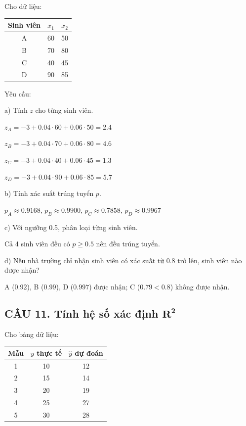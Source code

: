 \documentclass[a4paper,12pt]{article}
\begin{document}
Cho dữ liệu:
\begin{center}
\begin{tabular}{|c|c|c|}
\hline
Sinh viên & $x_1$ & $x_2$ \\
\hline
A & 60 & 50 \\
B & 70 & 80 \\
C & 40 & 45 \\
D & 90 & 85 \\
\hline
\end{tabular}
\end{center}

Yêu cầu:

a) Tính $z$ cho từng sinh viên.

$z_A = -3 + 0.04 \cdot 60 + 0.06 \cdot 50 = 2.4$

$z_B = -3 + 0.04 \cdot 70 + 0.06 \cdot 80 = 4.6$

$z_C = -3 + 0.04 \cdot 40 + 0.06 \cdot 45 = 1.3$

$z_D = -3 + 0.04 \cdot 90 + 0.06 \cdot 85 = 5.7$

b) Tính xác suất trúng tuyển $p$.

$p_A \approx 0.9168$, $p_B \approx 0.9900$, $p_C \approx 0.7858$, $p_D \approx 0.9967$

c) Với ngưỡng 0.5, phân loại từng sinh viên.

Cả 4 sinh viên đều có $p \geq 0.5$ nên đều trúng tuyển.

d) Nếu nhà trường chỉ nhận sinh viên có xác suất từ 0.8 trở lên, sinh viên nào được nhận?

A ($0.92$), B ($0.99$), D ($0.997$) được nhận; C ($0.79 < 0.8$) không được nhận.

\subsection*{CÂU 11. Tính hệ số xác định $\mathbf{R^2}$}

Cho bảng dữ liệu:
\begin{center}
\begin{tabular}{|c|c|c|}
\hline
Mẫu & $y$ thực tế & $\hat{y}$ dự đoán \\
\hline
1 & 10 & 12 \\
2 & 15 & 14 \\
3 & 20 & 19 \\
4 & 25 & 27 \\
5 & 30 & 28 \\
\hline
\end{tabular}
\end{center}
\end{document}
